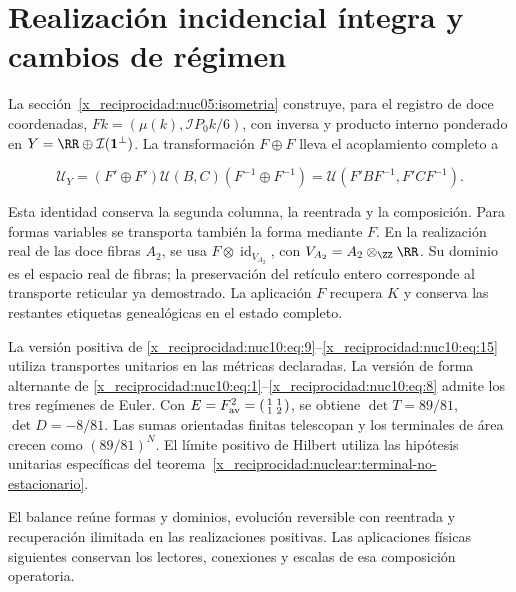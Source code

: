 \section{Realización incidencial íntegra y cambios de régimen}

La sección~\ref{x_reciprocidad:nuc05:isometria} construye, para el registro de doce
coordenadas, \(Fk=(\mu(k),\mathcal IP_0k/6)\), con inversa y
producto interno ponderado en \(Y=\RR\oplus\mathcal I(\mathbf1^\perp)\).
La transformación \(F\oplus F\) lleva el acoplamiento completo a



\begin{equation}
\mathcal U_Y=(F'\oplus F')\mathcal U(B,C)(F^{-1}\oplus F^{-1})
=\mathcal U(F'BF^{-1},F'CF^{-1}).
\label{x_reciprocidad:nuc10:eq:16}
\end{equation}



Esta identidad conserva la segunda columna, la reentrada y la composición.
Para formas variables se transporta también la forma mediante \(F\).
En la realización real de las doce fibras \(A_2\), se usa
\(F\otimes\operatorname{id}_{V_{A_2}}\), con
\(V_{A_2}=A_2\otimes_{\ZZ}\RR\). Su dominio es el espacio real de
fibras; la preservación del retículo entero corresponde al transporte
reticular ya demostrado. La aplicación \(F\) recupera \(K\) y
conserva las restantes etiquetas genealógicas en el estado completo.

La versión positiva de \eqref{x_reciprocidad:nuc10:eq:9}–\eqref{x_reciprocidad:nuc10:eq:15} utiliza transportes unitarios en las
métricas declaradas. La versión de forma alternante de \eqref{x_reciprocidad:nuc10:eq:1}–\eqref{x_reciprocidad:nuc10:eq:8} admite
los tres regímenes de Euler. Con
\(E=F_{\rm av}^2=\left(\begin{smallmatrix}1&1\\1&2\end{smallmatrix}\right)\),
se obtiene \(\det T=89/81\), \(\det D=-8/81\). Las sumas
orientadas finitas telescopan y los terminales de área crecen como
\((89/81)^N\). El límite positivo de Hilbert utiliza las hipótesis
unitarias específicas del teorema~\ref{x_reciprocidad:nuclear:terminal-no-estacionario}.

El balance reúne formas y dominios, evolución reversible con reentrada
y recuperación ilimitada en las realizaciones positivas. Las
aplicaciones físicas siguientes conservan los lectores, conexiones y
escalas de esa composición operatoria.
